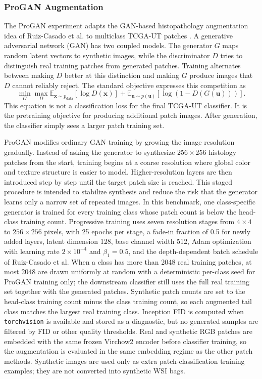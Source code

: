 \documentclass[11pt]{article}
\begin{document}
\subsubsection{ProGAN Augmentation}
The ProGAN experiment adapts the GAN-based histopathology augmentation idea of Ruiz-Casado et al. to multiclass TCGA-UT patches \citep{ruizcasado2024enhancingHistopathological}. A generative adversarial network (GAN) has two coupled models. The generator $G$ maps random latent vectors to synthetic images, while the discriminator $D$ tries to distinguish real training patches from generated patches. Training alternates between making $D$ better at this distinction and making $G$ produce images that $D$ cannot reliably reject. The standard objective expresses this competition as
\begin{equation}
  \min_G \max_D
  \mathbb{E}_{\mathbf{x}\sim p_{\mathrm{data}}}[\log D(\mathbf{x})]
  + \mathbb{E}_{\mathbf{u}\sim p(\mathbf{u})}[\log(1-D(G(\mathbf{u})))].
  \label{eq:gan}
\end{equation}
\noindent This equation is not a classification loss for the final TCGA-UT classifier. It is the pretraining objective for producing additional patch images. After generation, the classifier simply sees a larger patch training set.

ProGAN modifies ordinary GAN training by growing the image resolution gradually. Instead of asking the generator to synthesize $256\times256$ histology patches from the start, training begins at a coarse resolution where global color and texture structure is easier to model. Higher-resolution layers are then introduced step by step until the target patch size is reached. This staged procedure is intended to stabilize synthesis and reduce the risk that the generator learns only a narrow set of repeated images. In this benchmark, one class-specific generator is trained for every training class whose patch count is below the head-class training count. Progressive training uses seven resolution stages from $4\times4$ to $256\times256$ pixels, with 25 epochs per stage, a fade-in fraction of 0.5 for newly added layers, latent dimension 128, base channel width 512, Adam optimization with learning rate $2\times10^{-4}$ and $\beta_1=0.5$, and the depth-dependent batch schedule of Ruiz-Casado et al. When a class has more than 2048 real training patches, at most 2048 are drawn uniformly at random with a deterministic per-class seed for ProGAN training only; the downstream classifier still uses the full real training set together with the generated patches. Synthetic patch counts are set to the head-class training count minus the class training count, so each augmented tail class matches the largest real training class. Inception FID is computed when \texttt{torchvision} is available and stored as a diagnostic, but no generated samples are filtered by FID or other quality thresholds. Real and synthetic RGB patches are embedded with the same frozen Virchow2 encoder before classifier training, so the augmentation is evaluated in the same embedding regime as the other patch methods. Synthetic images are used only as extra patch-classification training examples; they are not converted into synthetic WSI bags.
\end{document}
